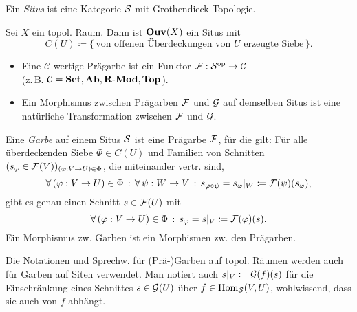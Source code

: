 \documentclass{cheat-sheet}
\begin{document}

\begin{defn}
  Ein \emph{Situs} ist eine Kategorie $\mathcal{S}$ mit Grothendieck-Topologie.
\end{defn}

\begin{defn}
  Sei $X$ ein topol. Raum. Dann ist $\mathbf{Ouv}(X)$ ein Situs mit
  \[ C(U) \coloneqq \{ \, \text{von offenen Überdeckungen von $U$ erzeugte Siebe} \, \}. \]
\end{defn}

\begin{defn}
  \begin{itemize}
    \item Eine $\mathcal{C}$-wertige Prägarbe ist ein Funktor $\mathcal{F} : \mathcal{S}^{\mathrm{op}} \to \mathcal{C}$ \\
    (z.\,B. $\mathcal{C} = \mathbf{Set}, \mathbf{Ab}, \mathbf{R\text{-}Mod}, \mathbf{Top}$).
    \item Ein Morphismus zwischen Prägarben $\mathcal{F}$ und $\mathcal{G}$ auf demselben Situs ist eine natürliche Transformation zwischen $\mathcal{F}$ und $\mathcal{G}$.
  \end{itemize}
\end{defn}

\begin{defn}
  Eine \emph{Garbe} auf einem Situs $\mathcal{S}$ ist eine Prägarbe $\mathcal{F}$, für die gilt:
  Für alle überdeckenden Siebe $\Phi \in C(U)$ und Familien von Schnitten $(s_\varphi \in \mathcal{F}(V))_{(\varphi : V \to U) \in \Phi}$, die miteinander vertr. sind, \dh{}
  \[ \forall \, {(\varphi : V \to U) \in \Phi} \,:\, \forall \, {\psi : W \to V} \,:\, s_{\varphi \circ \psi} = s_\varphi|_W \coloneqq \mathcal{F}(\psi)(s_\varphi), \]
  gibt es genau einen Schnitt $s \in \mathcal{F}(U)$ mit
  \[ \forall \, {(\varphi : V \to U) \in \Phi} \,:\, s_\varphi = s|_V \coloneqq \mathcal{F}(\varphi)(s). \]
  Ein Morphismus zw. Garben ist ein Morphismen zw. den Prägarben.
\end{defn}

\begin{bem}
  Die Notationen und Sprechw. für (Prä-)Garben auf topol. Räumen werden auch für Garben auf Siten verwendet.
  Man notiert auch $s|_V \coloneqq \mathcal{G}(f)(s)$ für die Einschränkung eines Schnittes $s \in \mathcal{G}(U)$ über $f \in \operatorname{Hom}_{\mathcal{S}}(V, U)$, wohlwissend, dass sie auch von $f$ abhängt.
\end{bem}
\end{document}
